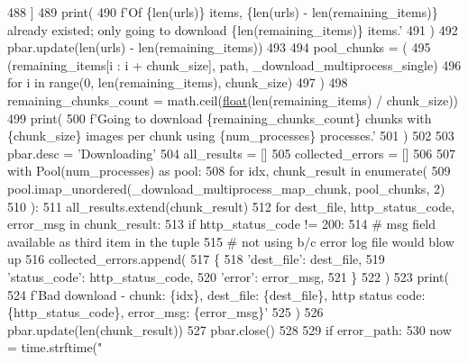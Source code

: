 \begin{DoxyCode}
488     ]
489     print(
490         f\textcolor{stringliteral}{'Of \{len(urls)\} items, \{len(urls) - len(remaining\_items)\} already existed; only going to download
       \{len(remaining\_items)\} items.'}
491     )
492     pbar.update(len(urls) - len(remaining\_items))
493 
494     pool\_chunks = (
495         (remaining\_items[i : i + chunk\_size], path, \_download\_multiprocess\_single)
496         \textcolor{keywordflow}{for} i \textcolor{keywordflow}{in} range(0, len(remaining\_items), chunk\_size)
497     )
498     remaining\_chunks\_count = math.ceil(\hyperlink{namespaceprojects_1_1controllable__dialogue_1_1make__control__dataset_aa2b7207688c641dbc094ab44eca27113}{float}(len(remaining\_items) / chunk\_size))
499     print(
500         f\textcolor{stringliteral}{'Going to download \{remaining\_chunks\_count\} chunks with \{chunk\_size\} images per chunk using
       \{num\_processes\} processes.'}
501     )
502 
503     pbar.desc = \textcolor{stringliteral}{'Downloading'}
504     all\_results = []
505     collected\_errors = []
506 
507     with Pool(num\_processes) \textcolor{keyword}{as} pool:
508         \textcolor{keywordflow}{for} idx, chunk\_result \textcolor{keywordflow}{in} enumerate(
509             pool.imap\_unordered(\_download\_multiprocess\_map\_chunk, pool\_chunks, 2)
510         ):
511             all\_results.extend(chunk\_result)
512             \textcolor{keywordflow}{for} dest\_file, http\_status\_code, error\_msg \textcolor{keywordflow}{in} chunk\_result:
513                 \textcolor{keywordflow}{if} http\_status\_code != 200:
514                     \textcolor{comment}{# msg field available as third item in the tuple}
515                     \textcolor{comment}{# not using b/c error log file would blow up}
516                     collected\_errors.append(
517                         \{
518                             \textcolor{stringliteral}{'dest\_file'}: dest\_file,
519                             \textcolor{stringliteral}{'status\_code'}: http\_status\_code,
520                             \textcolor{stringliteral}{'error'}: error\_msg,
521                         \}
522                     )
523                     print(
524                         f\textcolor{stringliteral}{'Bad download - chunk: \{idx\}, dest\_file: \{dest\_file\}, http status code:
       \{http\_status\_code\}, error\_msg: \{error\_msg\}'}
525                     )
526             pbar.update(len(chunk\_result))
527     pbar.close()
528 
529     \textcolor{keywordflow}{if} error\_path:
530         now = time.strftime(\textcolor{stringliteral}{"%
}
\end{DoxyCode}
